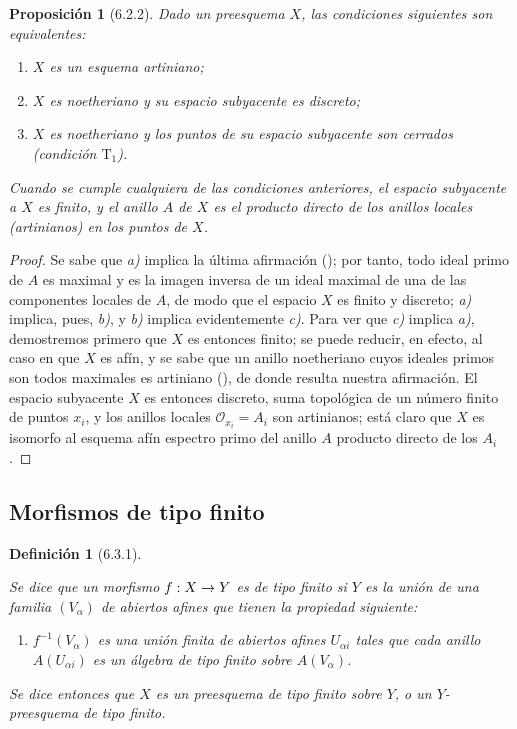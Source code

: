 \documentclass[oneside]{amsart}
\theoremstyle{ega-env-style}
\theoremstyle{ega-thm-env-style}
\newtheorem*{proposition}{Proposición}
\theoremstyle{ega-defn-env-style}
\newtheorem*{definition}{Definición}
\renewcommand{\to}{\mathchoice{\longrightarrow}{\rightarrow}{\rightarrow}{\rightarrow}}
\newcommand{\oldpage}[2][]{{\marginnote{\normalfont{\textbf{#1}~|~#2}}}\ignorespaces}
\let\EGAOriginalLabel\label
\renewcommand{\label}[1]{\phantomsection\EGAOriginalLabel{#1}}
\begin{document}
\oldpage[I]{144}
\begin{proposition}[6.2.2]
\label{I.6.2.2}
Dado
un preesquema $X$, las condiciones siguientes son equivalentes:
\begin{enumerate}
  \item[\textit{a)}] $X$ es un esquema artiniano;
  \item[\textit{b)}] $X$ es noetheriano y su espacio subyacente es discreto;
  \item[\textit{c)}] $X$ es noetheriano y los puntos de su espacio subyacente son cerrados \emph{(condición $\mathrm{T}_1$)}.
\end{enumerate}
Cuando se cumple cualquiera de las condiciones anteriores, el espacio subyacente a $X$ es finito, y el anillo $A$ de $X$ es el producto directo de los anillos locales (artinianos) en los puntos de $X$.
\end{proposition}

\begin{proof}
Se sabe que \emph{a)} implica la última afirmación (\cite[p.~205, th.~3]{I-13}); por tanto, todo ideal primo de $A$ es maximal y es la imagen inversa de un ideal maximal de una de las componentes locales de $A$, de modo que el espacio $X$ es finito y discreto;
\emph{a)} implica, pues, \emph{b)}, y \emph{b)} implica evidentemente \emph{c)}.
Para ver que \emph{c)} implica \emph{a)}, demostremos primero que $X$ es entonces finito;
se puede reducir, en efecto, al caso en que $X$ es afín, y se sabe que un anillo noetheriano cuyos ideales primos son todos maximales es artiniano (\cite[p.~203]{I-13}), de donde resulta nuestra afirmación.
El espacio subyacente $X$ es entonces discreto, suma topológica de un número finito de puntos $x_i$, y los anillos locales $\mathscr{O}_{x_i}=A_i$ son artinianos;
está claro que $X$ es isomorfo al esquema afín espectro primo del anillo $A$ producto directo de los $A_i$ .
\end{proof}

\subsection{Morfismos de tipo finito}
\label{subsection:I.6.3}

\begin{definition}[6.3.1]
\label{I.6.3.1}
{\itshape Se dice que un morfismo $f:X\to Y$ es de tipo finito si $Y$ es la unión de una familia $(V_\alpha)$ de abiertos afines que tienen la propiedad siguiente:
\begin{enumerate}
  \item[\textup{(P)}] $f^{-1}(V_\alpha)$ es una unión finita de abiertos afines $U_{\alpha i}$ tales que cada anillo $A(U_{\alpha i})$ es un álgebra de tipo finito sobre $A(V_\alpha)$.
\end{enumerate}
Se dice entonces que $X$ es un preesquema de tipo finito sobre $Y$, o un $Y$-preesquema de tipo finito.}
\end{definition}
\end{document}
